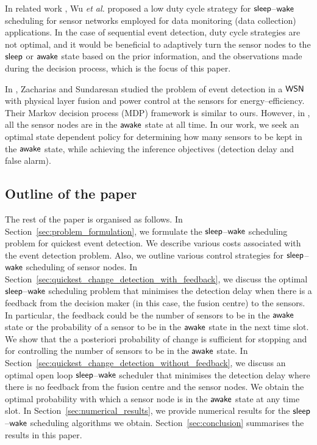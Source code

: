 \documentclass[journal]{IEEEtran}
\newcommand{\sleep}{{${\sf sleep }$}}
\newcommand{\wake}{{${\sf awake }$}}
\begin{document}
In related work \cite{wu-etal07sleep-awake}, Wu {\em et al.} proposed a
low duty cycle strategy for \sleep--${\sf wake}$ scheduling for sensor
networks employed for data monitoring (data collection) applications. In
the case of sequential event detection, duty cycle strategies are not
optimal, and it would be beneficial to adaptively turn the sensor nodes
to the {\sleep} or {\wake} state based on the prior information, and the
observations made during the decision process, which is the focus of
this paper.

In \cite{lz-rs07decentralized}, Zacharias and Sundaresan studied the
problem of event detection in a ${\sf WSN}$ with physical layer fusion
and power control at the sensors for energy--efficiency. Their Markov
decision process (MDP) framework is similar to ours. However, in
\cite{lz-rs07decentralized}, all the sensor nodes are in the {\wake}
state at all time. In our work, we seek an optimal state dependent
policy for determining how many sensors to be kept in the {\wake} state,
while achieving the inference objectives (detection delay and false 
alarm).



\subsection{Outline of the paper}
\label{subsec:outline_of_the_paper}
The rest of the paper is organised as follows. In
Section~\ref{sec:problem_formulation}, we formulate the \sleep--${\sf
wake}$ scheduling problem for quickest event detection. We describe
various costs associated with the event detection problem. Also, we
outline various control strategies for \sleep--${\sf wake}$ scheduling
of sensor nodes. In
Section~\ref{sec:quickest_change_detection_with_feedback}, we discuss
the optimal \sleep--${\sf wake}$ scheduling problem that minimises the
detection delay when there is a feedback from the decision maker (in
this case, the fusion centre) to the sensors. In particular, the
feedback could be the number of sensors to be in the {\wake} state or
the probability of a sensor to be in the {\wake} state in the next time
slot. We show that the a posteriori probability of change is sufficient
for stopping and for controlling the number of sensors to be in the
{\wake} state. In
Section~\ref{sec:quickest_change_detection_without_feedback}, we discuss
an optimal open loop \sleep--${\sf wake}$ scheduler that minimises the
detection delay where there is no feedback from the fusion centre and
the sensor nodes. We obtain the optimal probability with which a sensor
node is in the {\wake} state at any time slot.  In
Section~\ref{sec:numerical_results}, we provide numerical results for
the \sleep--${\sf wake}$ scheduling algorithms we obtain.
Section~\ref{sec:conclusion} summarises the results in this paper.
\end{document}
